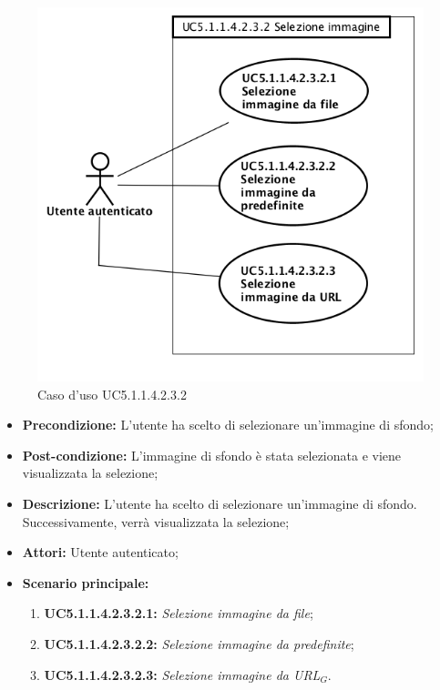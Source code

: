 \begin{figure}[h]
	\begin{center}
	\includegraphics[scale=0.4]{diagram/UC5-1-1-4-2-3-2.png}
	\caption{Caso d'uso UC5.1.1.4.2.3.2}
	\end{center}
\end{figure}
\begin{itemize}
	\item \textbf{Precondizione:} L'utente ha scelto di selezionare un'immagine di sfondo;
	\item \textbf{Post-condizione:} L'immagine di sfondo è stata selezionata e viene visualizzata la selezione;
	\item \textbf{Descrizione:} L'utente ha scelto di selezionare un'immagine di sfondo. Successivamente, verrà visualizzata la selezione;
	\item \textbf{Attori:} Utente autenticato;
	\item \textbf{Scenario principale:}
	\begin{enumerate}
		\item \textbf{ UC5.1.1.4.2.3.2.1:} \textit{ Selezione immagine da file};
		\item \textbf{ UC5.1.1.4.2.3.2.2:} \textit{ Selezione immagine da predefinite};
		\item \textbf{ UC5.1.1.4.2.3.2.3:} \textit{ Selezione immagine da URL$_G$}.
	\end{enumerate}
\end{itemize}
